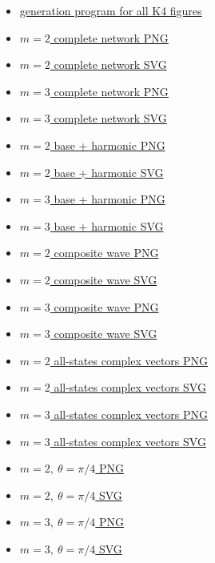 \documentclass[
  a4paper,
]{article}
\providecommand{\tightlist}{%
  \setlength{\itemsep}{0pt}\setlength{\parskip}{0pt}}
\begin{document}
\begin{itemize}
\tightlist
\item
  \href{generate_all_K4_harmonic_figures_20260915.py}{generation program
  for all K4 figures}
\item
  \href{figs/K4_complete_network_m2.png}{\(m=2\) complete network PNG}
\item
  \href{K4_complete_network_m2.svg}{\(m=2\) complete network SVG}
\item
  \href{figs/K4_complete_network_m3.png}{\(m=3\) complete network PNG}
\item
  \href{K4_complete_network_m3.svg}{\(m=3\) complete network SVG}
\item
  \href{figs/waves_base_harmonic_m2.png}{\(m=2\) base + harmonic PNG}
\item
  \href{waves_base_harmonic_m2.svg}{\(m=2\) base + harmonic SVG}
\item
  \href{figs/waves_base_harmonic_m3.png}{\(m=3\) base + harmonic PNG}
\item
  \href{waves_base_harmonic_m3.svg}{\(m=3\) base + harmonic SVG}
\item
  \href{figs/composite_wave_m2.png}{\(m=2\) composite wave PNG}
\item
  \href{composite_wave_m2.svg}{\(m=2\) composite wave SVG}
\item
  \href{figs/composite_wave_m3.png}{\(m=3\) composite wave PNG}
\item
  \href{composite_wave_m3.svg}{\(m=3\) composite wave SVG}
\item
  \href{figs/complex_vectors_all_states_m2.png}{\(m=2\) all-states
  complex vectors PNG}
\item
  \href{complex_vectors_all_states_m2.svg}{\(m=2\) all-states complex
  vectors SVG}
\item
  \href{figs/complex_vectors_all_states_m3.png}{\(m=3\) all-states
  complex vectors PNG}
\item
  \href{complex_vectors_all_states_m3.svg}{\(m=3\) all-states complex
  vectors SVG}
\item
  \href{figs/complex_vectors_theta_pi4_m2.png}{\(m=2,\ \theta=\pi/4\)
  PNG}
\item
  \href{complex_vectors_theta_pi4_m2.svg}{\(m=2,\ \theta=\pi/4\) SVG}
\item
  \href{figs/complex_vectors_theta_pi4_m3.png}{\(m=3,\ \theta=\pi/4\)
  PNG}
\item
  \href{complex_vectors_theta_pi4_m3.svg}{\(m=3,\ \theta=\pi/4\) SVG}
\end{itemize}
\end{document}
